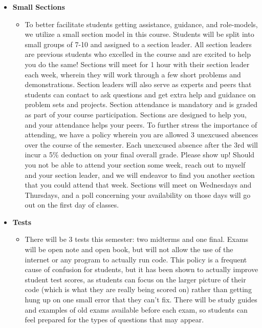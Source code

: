 \documentclass[11pt]{article}
\begin{document}
\begin{itemize}
	\item \textbf {Small Sections}
		\begin{itemize}
			\item To better facilitate students getting assistance, guidance, and role-models, we utilize a small section model in this course. Students will be split into small groups of 7-10 and assigned to a section leader. All section leaders are previous students who excelled in the course and are excited to help you do the same! Sections will meet for 1 hour with their section leader each week, wherein they will work through a few short problems and demonstrations. Section leaders will also serve as experts and peers that students can contact to ask questions and get extra help and guidance on problem sets and projects. Section attendance is mandatory and is graded as part of your course participation. Sections are designed to help you, and your attendance helps your peers. To further stress the importance of attending, we have a policy wherein you are allowed 3 unexcused absences over the course of the semester. Each unexcused absence after the 3rd will incur a 5\% deduction on your final overall grade. Please show up! Should you not be able to attend your section some week, reach out to myself and your section leader, and we will endeavor to find you another section that you could attend that week. Sections will meet on Wednesdays and Thursdays, and a poll concerning your availability on those days will go out on the first day of classes.
		\end{itemize}
	\item \textbf {Tests}
		\begin{itemize}
			\item There will be 3 tests this semester: two midterms and one final. Exams will be open note and open book, but will not allow the use of the internet or any program to actually run code. This policy is a frequent cause of confusion for students, but it has been shown to actually improve student test scores, as students can focus on the larger picture of their code (which is what they are really being scored on) rather than getting hung up on one small error that they can't fix. There will be study guides and examples of old exams available before each exam, so students can feel prepared for the types of questions that may appear.

\end{itemize}
\end{itemize}
\end{document}
